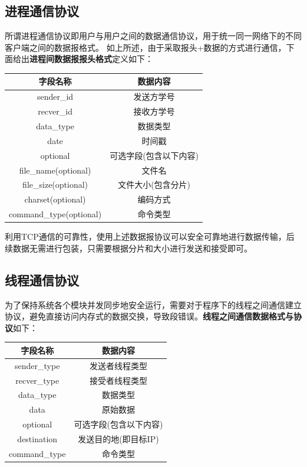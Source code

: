 \documentclass[UTF8]{ctexart}
\begin{document}
\subsection{进程通信协议}\label{progress}
所谓进程通信协议即用户与用户之间的数据通信协议，用于统一同一网络下的不同客户端之间的数据报格式。
如上所述，由于采取报头+数据的方式进行通信，下面给出\textbf{进程间数据报报头格式}定义如下：
\begin{table}[H]
    \centering
    \begin{tabular}{cc}
        \hline
        字段名称 & 数据内容 \\
        \hline
        sender\_id & 发送方学号\\
        recver\_id & 接收方学号\\
        data\_type & 数据类型\\
        date & 时间戳\\
        optional & 可选字段(包含以下内容)\\
        file\_name(optional) & 文件名\\
        file\_size(optional) & 文件大小(包含分片)\\
        charset(optional) & 编码方式\\
        command\_type(optional) & 命令类型\\
        \hline
    \end{tabular}
\end{table}

利用TCP通信的可靠性，使用上述数据报协议可以安全可靠地进行数据传输，后续数据无需进行包装，只需要根据分片和大小进行发送和接受即可。



\subsection{线程通信协议}\label{thread}

为了保持系统各个模块并发同步地安全运行，需要对于程序下的线程之间通信建立协议，避免直接访问内存式的数据交换，导致段错误。\textbf{线程之间通信数据格式与协议}如下：
\begin{table}[H]
    \centering
    \begin{tabular}{cc}
        \hline
        字段名称 & 数据内容 \\
        \hline
        sender\_type & 发送者线程类型\\
        recver\_type & 接受者线程类型\\
        data\_type & 数据类型\\
        data & 原始数据 \\
        optional & 可选字段(包含以下内容)\\
        destination & 发送目的地(即目标IP)\\
        command\_type&命令类型\\
        \hline
    \end{tabular}
\end{table}
\end{document}
